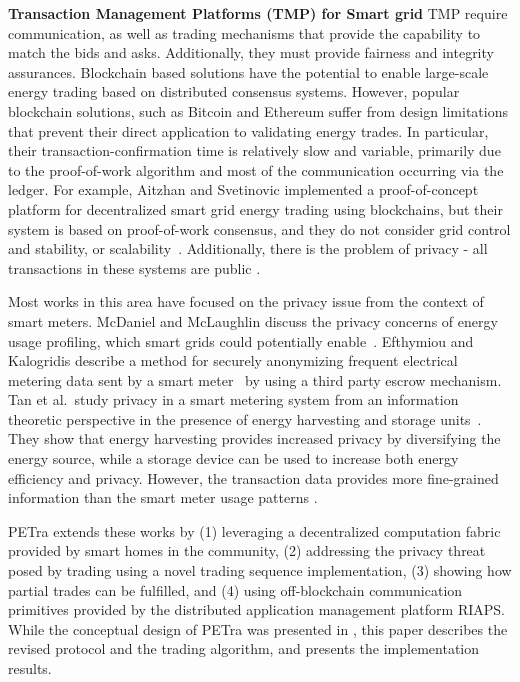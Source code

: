 \documentclass[sigplan]{acmart}
\newcommand{\Abhishek}[1]{\todo[color=yellow!50, linecolor=black!50]{\textbf{Abhishek}: #1}}
\newcommand{\Aron}[1]{\todo[color=blue!30, linecolor=black!50]{\textbf{Aron}: #1}}
\begin{document}
\textbf{Transaction Management Platforms (TMP) for Smart grid} 
TMP require communication, as well as trading mechanisms that provide the capability to match the bids and asks. Additionally, they must provide fairness and integrity assurances.  Blockchain based solutions have the potential to enable large-scale energy trading based on distributed consensus systems. However, popular blockchain solutions, such as Bitcoin \cite{Satoshi} and Ethereum \cite{buterin2013ethereum} suffer from design limitations that prevent their direct application to validating energy trades. In particular, their transaction-confirmation time is relatively slow and variable, primarily due to the proof-of-work algorithm and most of the communication occurring via the ledger.
For example, Aitzhan and Svetinovic implemented a proof-of-concept platform for decentralized smart grid energy trading using blockchains, but their system is based on proof-of-work consensus, and they do not consider grid control and stability, or scalability~\cite{aitzhan2016security}. Additionally, there is the problem of privacy - all transactions in these systems are  public \cite{kosba2016hawk}. 

Most works in this area have focused on the privacy issue from the context of smart meters. McDaniel and McLaughlin discuss the
privacy concerns of energy usage profiling, which smart grids could
potentially enable~\cite{mcdaniel2009security}. Efthymiou and Kalogridis describe a method for securely anonymizing frequent electrical metering data sent by a smart
meter~\cite{efthymiou2010smart} by using a third party escrow mechanism. Tan et
al.\ study privacy in a smart metering system from an information
theoretic perspective in the presence of energy harvesting and storage
units~\cite{tan2013increasing}. They show that energy harvesting
provides increased privacy by diversifying the energy source, while a
storage device can be used to increase both energy efficiency and
privacy. However, the transaction data provides more fine-grained information than the smart meter usage patterns \cite{Privacy2017}. 

PETra extends these works by (1) leveraging a decentralized computation fabric provided by smart homes in the community,
(2) addressing the privacy
threat posed by trading using a novel trading sequence implementation, (3) showing how partial trades can be fulfilled, and (4) using off-blockchain communication primitives provided by the distributed application management platform RIAPS. While the conceptual design of PETra was presented in \cite{Laszka17}, this paper describes the revised protocol and the trading algorithm, and presents the implementation results. 
\end{document}
